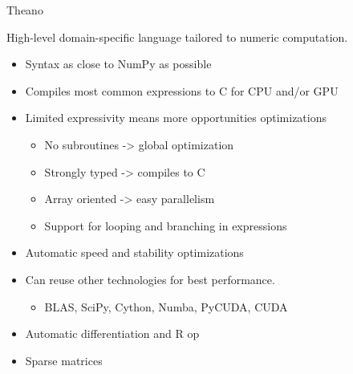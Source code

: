\documentclass[utf8x,xcolor=pdftex,dvipsnames,table]{beamer}
\begin{document}






\begin{frame}{Theano}

  High-level domain-specific language tailored to numeric computation.

  \begin{itemize}
    \item Syntax as close to NumPy as possible
    \item Compiles most common expressions to C for CPU and/or GPU
    \item Limited expressivity means more opportunities optimizations
    \begin{itemize}
      \item No subroutines -> global optimization
      \item Strongly typed -> compiles to C
      \item Array oriented -> easy parallelism
      \item Support for looping and branching in expressions
    \end{itemize}
    \item Automatic speed and stability optimizations
    \item Can reuse other technologies for best performance.
    \begin{itemize}
      \item BLAS, SciPy, Cython, Numba, PyCUDA, CUDA
    \end{itemize}
    \item Automatic differentiation and R op
    \item Sparse matrices
  \end{itemize}
\end{frame}
\end{document}
